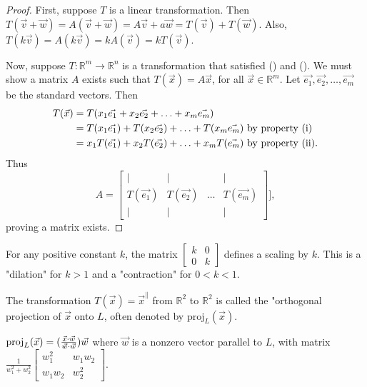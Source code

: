 \documentclass[a4paper,11pt]{article}
\begin{document}
\begin{outline}
    \begin{proof}
      \forward
        First, suppose \(T\) is a linear transformation. Then \(T(\vec{v} + \vec{w}) = A(\vec{v} + \vec{w})
        = A\vec{v} + a\vec{w} = T(\vec{v}) + T(\vec{w})\). Also, \(T(k\vec{v}) = A(k\vec{v}) = kA(\vec{v}) 
        = kT(\vec{v})\).
        
      \backward
        Now, suppose \(T: \mathbb{R}^m \rightarrow \mathbb{R}^n\) is a transformation that satisfied
        () and (). We must show a matrix \(A\) exists such that \(T(\vec{x}) = A\vec{x}\), for
        all \(\vec{x} \in \mathbb{R}^m\). Let \(\vec{e_1}, \vec{e_2}, \ldots, \vec{e_m}\) be the standard vectors. Then
        \begin{align*}
          T(\vec{x}) &= T(x_1\vec{e_1} + x_2\vec{e_2} + \ldots + x_m\vec{e_m})\\
                     &= T(x_1\vec{e_1}) + T(x_2\vec{e_2}) + \ldots + T(x_m\vec{e_m}) \text{ by property (\romannumeral 1)}\\
                     &= x_1T(\vec{e_1}) + x_2T(\vec{e_2}) + \ldots + x_mT(\vec{e_m}) \text{ by property (\romannumeral 2).}
        \end{align*}
        Thus 
        \[ A = \begin{bmatrix}
          \vert        & \vert        &        & \vert       \\
          T(\vec{e_1}) & T(\vec{e_2}) & \ldots & T(\vec{e_m})\\
          \vert        & \vert        &        & \vert       \end{bmatrix}], 
        \] proving a matrix exists.
    \end{proof}
    
    For any positive constant \(k\), the matrix \(\begin{bmatrix} k&0\\ 0&k \end{bmatrix}\) defines
    a scaling by \(k\). This is a "dilation" for \(k > 1\) and a "contraction" for \(0 < k < 1\).
    
    The transformation \(T(\vec{x}) = \vec{x}^{\parallel}\) from \(\mathbb{R}^2\) to \(\mathbb{R}^2\)
    is called the "orthogonal projection of \(\vec{x}\) onto \(L\), often denoted by \(\text{proj}_{L}(\vec{x})\).
    
    \(\text{proj}_{L}(\vec{x}) = (\frac{\vec{x}\cdot\vec{w}}{\vec{w}\cdot\vec{w}})\vec{w}\) 
    where \(\vec{w}\) is a nonzero vector parallel to \(L\), with matrix \(\frac{1}{w_1^2 + w_2^2}
    \begin{bmatrix} w_1^2&w_1w_2\\ w_1w_2&w_2^2 \end{bmatrix}\).
    

\end{outline}
\end{document}

